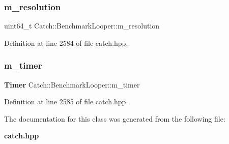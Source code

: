 \subsubsection{m\_resolution}
{\footnotesize\ttfamily uint64\+\_\+t Catch\+::\+Benchmark\+Looper\+::m\+\_\+resolution\hspace{0.3cm}{\ttfamily [private]}}



Definition at line 2584 of file catch.\+hpp.

\mbox{\label{class_catch_1_1_benchmark_looper_af86aacecba12576f96a1d3f321a0c959}} 
\subsubsection{m\_timer}
{\footnotesize\ttfamily \textbf{ Timer} Catch\+::\+Benchmark\+Looper\+::m\+\_\+timer\hspace{0.3cm}{\ttfamily [private]}}



Definition at line 2585 of file catch.\+hpp.



The documentation for this class was generated from the following file\+:\begin{DoxyCompactItemize}
\item 
\textbf{ catch.\+hpp}\end{DoxyCompactItemize}
